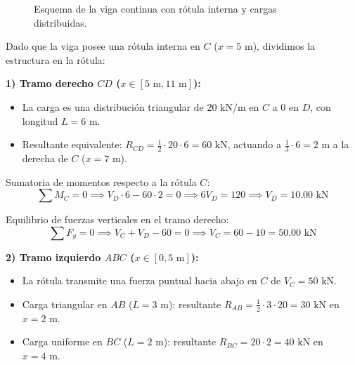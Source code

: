 \begin{figure}[H]
{%
    }
    \caption{Esquema de la viga continua con rótula interna y cargas distribuidas.}
\end{figure}


Dado que la viga posee una rótula interna en $C$ ($x = 5\text{ m}$), dividimos la estructura en la rótula:

\textbf{1) Tramo derecho $CD$ ($x \in [5\text{ m}, 11\text{ m}]$):}
\begin{itemize}
    \item La carga es una distribución triangular de $20\text{ kN/m}$ en $C$ a $0$ en $D$, con longitud $L = 6\text{ m}$.
    \item Resultante equivalente: $R_{CD} = \frac{1}{2} \cdot 20 \cdot 6 = 60\text{ kN}$, actuando a $\frac{1}{3} \cdot 6 = 2\text{ m}$ a la derecha de $C$ ($x = 7\text{ m}$).
\end{itemize}

Sumatoria de momentos respecto a la rótula $C$:
\begin{equation}
    \sum M_C = 0 \implies V_D \cdot 6 - 60 \cdot 2 = 0 \implies 6 V_D = 120 \implies \boxed{V_D = 10.00\text{ kN}}
\end{equation}

Equilibrio de fuerzas verticales en el tramo derecho:
\begin{equation}
    \sum F_y = 0 \implies V_C + V_D - 60 = 0 \implies V_C = 60 - 10 = \boxed{50.00\text{ kN}}
\end{equation}

\textbf{2) Tramo izquierdo $ABC$ ($x \in [0, 5\text{ m}]$):}
\begin{itemize}
    \item La rótula transmite una fuerza puntual hacia abajo en $C$ de $V_C = 50\text{ kN}$.
    \item Carga triangular en $AB$ ($L=3\text{ m}$): resultante $R_{AB} = \frac{1}{2} \cdot 3 \cdot 20 = 30\text{ kN}$ en $x = 2\text{ m}$.
    \item Carga uniforme en $BC$ ($L=2\text{ m}$): resultante $R_{BC} = 20 \cdot 2 = 40\text{ kN}$ en $x = 4\text{ m}$.
\end{itemize}

